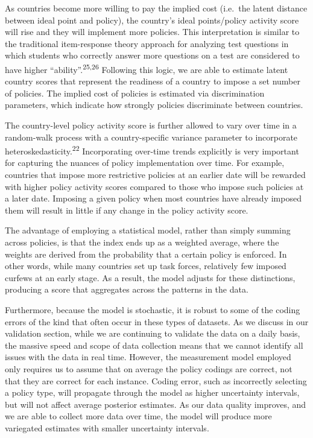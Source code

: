 \documentclass[
]{article}
\begin{document}
As countries become more willing to pay the implied cost (i.e.~the latent distance between ideal point and policy), the country's ideal points/policy activity score will rise and they will implement more policies. This interpretation is similar to the traditional item-response theory approach for analyzing test questions in which students who correctly answer more questions on a test are considered to have higher ``ability''.\textsuperscript{25,26} Following this logic, we are able to estimate latent country scores that represent the readiness of a country to impose a set number of policies. The implied cost of policies is estimated via discrimination parameters, which indicate how strongly policies discriminate between countries.

The country-level policy activity score is further allowed to vary over time in a random-walk process with a country-specific variance parameter to incorporate heteroskedasticity.\textsuperscript{22} Incorporating over-time trends explicitly is very important for capturing the nuances of policy implementation over time. For example, countries that impose more restrictive policies at an earlier date will be rewarded with higher policy activity scores compared to those who impose such policies at a later date. Imposing a given policy when most countries have already imposed them will result in little if any change in the policy activity score.

The advantage of employing a statistical model, rather than simply summing across policies, is that the index ends up as a weighted average, where the weights are derived from the probability that a certain policy is enforced. In other words, while many countries set up task forces, relatively few imposed curfews at an early stage. As a result, the model adjusts for these distinctions, producing a score that aggregates across the patterns in the data.

Furthermore, because the model is stochastic, it is robust to some of the coding errors of the kind that often occur in these types of datasets. As we discuss in our validation section, while we are continuing to validate the data on a daily basis, the massive speed and scope of data collection means that we cannot identify all issues with the data in real time. However, the measurement model employed only requires us to assume that on average the policy codings are correct, not that they are correct for each instance. Coding error, such as incorrectly selecting a policy type, will propagate through the model as higher uncertainty intervals, but will not affect average posterior estimates. As our data quality improves, and we are able to collect more data over time, the model will produce more variegated estimates with smaller uncertainty intervals.
\end{document}
